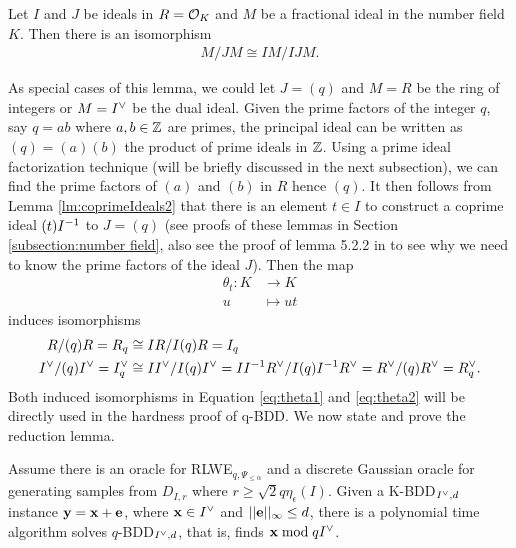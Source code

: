 \documentclass[../main.tex]{subfiles}
\begin{document}
\begin{lemma}
\label{lm:clearIdeals2}
Let $I$ and $J$ be ideals in $R=\mathcal{O}_K$ and $M$ be a fractional ideal in the number field $K$. Then there is an isomorphism 
\begin{align*}
    M/JM \cong IM/IJM.
\end{align*}
\end{lemma}

As special cases of this lemma, we could let $J=(q)$ and $M=R$ be the ring of integers or $M=I^{\vee}$ be the dual ideal. Given the prime factors of the integer $q$, say $q=ab$ where $a,b \in \mathbb{Z}$ are primes, the principal ideal can be written as $(q)=(a)(b)$ the product of prime ideals in $\mathbb{Z}$. Using a prime ideal factorization technique (will be briefly discussed in the next subsection), we can find the prime factors of $(a)$ and $(b)$ in $R$ hence $(q)$. It then follows from Lemma \ref{lm:coprimeIdeals2} that there is an element $t \in I$ to construct a coprime ideal $(t)I^{-1}$ to $J=(q)$ (see proofs of these lemmas in Section \ref{subsection:number field}, also see the proof of lemma 5.2.2 in \cite{stein2012algebraic} to see why we need to know the prime factors of the ideal $J$). Then the map 
\begin{align*}
    \theta_t: K &\rightarrow K \\
    u &\mapsto ut
\end{align*}
induces isomorphisms 
\begin{align}
\label{eq:theta1}
    R/(q)R = R_q & \cong IR/I(q)R =I_q\\
    \label{eq:theta2}
    I^{\vee}/(q)I^{\vee}=I^{\vee}_q &\cong II^{\vee}/I(q)I^{\vee}=I I^{-1}R^{\vee}/I(q)I^{-1}R^{\vee} = R^{\vee}/(q)R^{\vee}=R^{\vee}_q.
\end{align}
Both induced isomorphisms in Equation \ref{eq:theta1} and \ref{eq:theta2} will be directly used in the hardness proof of q-BDD. We now state and prove the reduction lemma. 

\begin{lemma}
\reversemarginpar
{}
Assume there is an oracle for RLWE$_{q,\Psi_{\le \alpha}}$ and a discrete Gaussian oracle for generating samples from $D_{I,r}$ where $r \ge \sqrt{2} q \eta_{\epsilon}(I)$. Given a K-BDD$_{I^{\vee},d}$ instance $\mathbf{y}=\mathbf{x}+\mathbf{e}$, where $\mathbf{x} \in I^{\vee}$ and $||\mathbf{e}||_{\infty} \le d$, there is a polynomial time algorithm solves $q$-BDD$_{I^{\vee},d}$, that is, finds $\mathbf{x} \bmod qI^{\vee}$.
\end{lemma}
\end{document}
